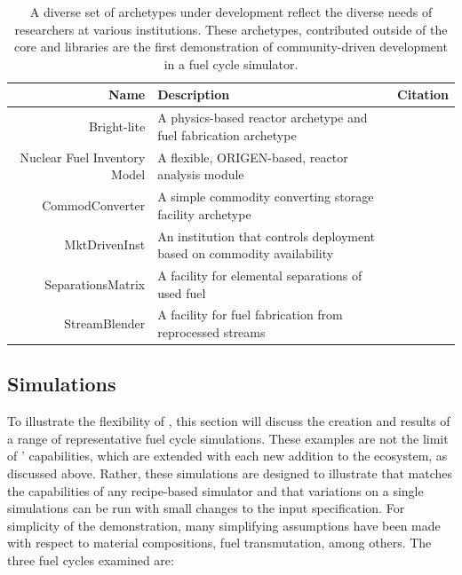 \begin{table}[H]
\centering
\begin{tabularx}{\textwidth}{|r|X|r|}
\hline
\textbf{Name} & \textbf{Description} & \textbf{Citation} \\
\hline
Bright-lite & A physics-based reactor archetype and fuel fabrication archetype & \cite{flanagan_bright-lite_2014} \\
Nuclear Fuel Inventory Model & A flexible, ORIGEN-based, reactor analysis module & \cite{skutnik_development_2015} \\
CommodConverter & A simple commodity converting storage facility archetype  & \cite{huff_commodconverter_2014} \\
MktDrivenInst & An institution that controls deployment based on commodity availability & \cite{huff_mktdriveninst_2014} \\
SeparationsMatrix & A facility for elemental separations of used fuel & \cite{huff_streamblender_2014} \\
StreamBlender & A facility for fuel fabrication from reprocessed streams & \cite{huff_streamblender_2014} \\
\hline
\end{tabularx}
\caption{A diverse set of archetypes under development reflect the diverse
needs of researchers at various institutions. These archetypes, contributed
outside of the \Cyclus core and \Cycamore libraries are the first demonstration
of community-driven development in a fuel cycle simulator.}
\label{tab:archetypes}
\end{table}

\subsection{Simulations}
\label{sec:simulations}


To illustrate the flexibility of \Cyclus, this section will discuss the 
creation and results of a range of representative fuel cycle simulations.
These examples are not the limit of \Cyclus' capabilities, which are extended with each new
addition to the ecosystem, as discussed above.  Rather, these simulations are
designed to illustrate that \Cyclus matches the capabilities of any
recipe-based simulator and that variations on a single \Cyclus simulations can 
be run with small changes to the input specification. For simplicity of the 
demonstration, many simplifying assumptions have been
made with respect to material compositions, fuel transmutation, among others.
The three fuel cycles examined are:

